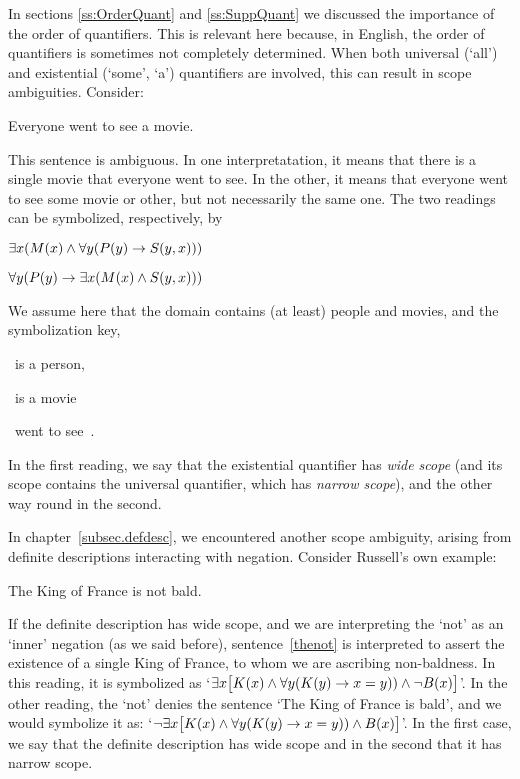 In sections \ref{ss:OrderQuant} and \ref{ss:SuppQuant} we discussed the importance of the order of quantifiers.  This is relevant here because, in English, the order of quantifiers is sometimes not completely determined.  When both universal (`all') and existential (`some', `a') quantifiers are  involved, this can result in scope ambiguities. Consider:
\begin{earg}
	\item[\ex{everya}] Everyone went to see a movie.
\end{earg}
This sentence is ambiguous.  In one interpretatation, it means that there is a single movie that everyone went to see. In the  other, it means that everyone went to see some movie or other, but not necessarily the same one. The two readings can be symbolized, respectively, by 
\begin{earg}
	\item[] $\exists x(\mathord{M}(x) \wedge \forall y(\mathord{P}(y) \rightarrow \mathord{S}(y,x)))$
	\item[] $\forall y(\mathord{P}(y) \rightarrow \exists x(\mathord{M}(x) \wedge \mathord{S}(y,x)))$
\end{earg}
We assume here that the domain contains (at least) people and movies, and the symbolization key,
\begin{ekey}
	\item[\atom{P}{y}] ~is a person, 
	\item[\atom{M}{x}] ~is a movie
	\item[\atom{S}{y,x}] ~went to see~. 
\end{ekey}
In the first reading, we say that the existential quantifier has \emph{wide scope} (and its scope contains the universal quantifier, which has \emph{narrow scope}), and the other way round in the second.

In chapter~\ref{subsec.defdesc}, we encountered another scope ambiguity, arising from definite descriptions interacting with negation.  Consider Russell's own example:
\begin{earg}
	\item[\ex{thenot}] The King of France is not bald.
\end{earg}
If the definite description has wide scope, and we are interpreting the `not' as an `inner' negation (as we said before), sentence~\ref{thenot} is interpreted to assert the existence of a single King of France, to whom we are ascribing non-baldness. In this reading, it is symbolized as `$\exists x\bigl[\mathord{K}(x) \wedge \forall y(\mathord{K}(y) \rightarrow x=y)) \wedge \neg \mathord{B}(x)\bigr]$'. In the other reading, the `not' denies the sentence `The King of France is bald', and we would symbolize it as: `$\neg\exists x\bigl[\mathord{K}(x) \wedge \forall y(\mathord{K}(y) \rightarrow x=y)) \wedge \mathord{B}(x)\bigr]$'. In the first case, we say that the definite description has wide scope and in the second that it has narrow scope.

